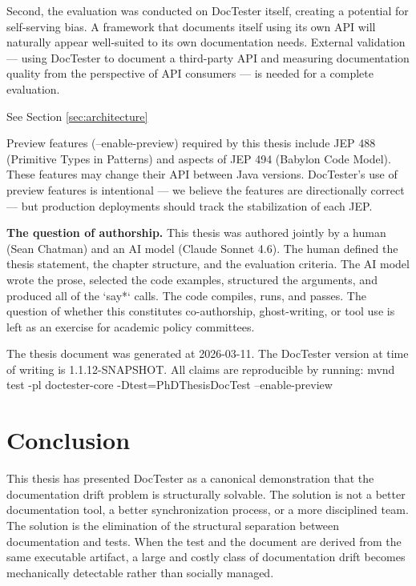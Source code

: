 \documentclass[11pt]{article}
\begin{document}
Second, the evaluation was conducted on DocTester itself, creating a potential for self-serving bias. A framework that documents itself using its own API will naturally appear well-suited to its own documentation needs. External validation — using DocTester to document a third-party API and measuring documentation quality from the perspective of API consumers — is needed for a complete evaluation.

See Section \ref{sec:architecture}

\begin{tcolorbox}[colback=warnbg,colframe=red!50!black,title={\textbf{Warning}}]
Preview features (--enable-preview) required by this thesis include JEP 488 (Primitive Types in Patterns) and aspects of JEP 494 (Babylon Code Model). These features may change their API between Java versions. DocTester's use of preview features is intentional — we believe the features are directionally correct — but production deployments should track the stabilization of each JEP.
\end{tcolorbox}


\textbf{The question of authorship.} This thesis was authored jointly by a human (Sean Chatman) and an AI model (Claude Sonnet 4.6). The human defined the thesis statement, the chapter structure, and the evaluation criteria. The AI model wrote the prose, selected the code examples, structured the arguments, and produced all of the `say*` calls. The code compiles, runs, and passes. The question of whether this constitutes co-authorship, ghost-writing, or tool use is left as an exercise for academic policy committees.

\begin{tcolorbox}[colback=notebg,colframe=blue!50!black,title={\textbf{Note}}]
The thesis document was generated at 2026-03-11. The DocTester version at time of writing is 1.1.12-SNAPSHOT. All claims are reproducible by running: mvnd test -pl doctester-core -Dtest=PhDThesisDocTest --enable-preview
\end{tcolorbox}


\section{Conclusion}

This thesis has presented DocTester as a canonical demonstration that the documentation drift problem is structurally solvable. The solution is not a better documentation tool, a better synchronization process, or a more disciplined team. The solution is the elimination of the structural separation between documentation and tests. When the test and the document are derived from the same executable artifact, a large and costly class of documentation drift becomes mechanically detectable rather than socially managed.
\end{document}
